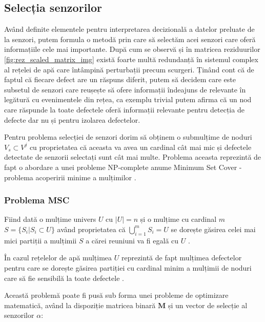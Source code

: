 \subsection{Selecția senzorilor}

Având definite elementele pentru interpretarea decizională a datelor preluate de la senzori, putem formula o metodă prin care să selectăm acei senzori care oferă informațiile cele mai importante. După cum se observă și în matricea reziduurilor \ref{fig:rez_scaled_matrix_img} există foarte multă redundanță în sistemul complex al rețelei de apă care întâmpină perturbații precum scurgeri. Ținând cont că de faptul că fiecare defect are un răspuns diferit, putem să decidem care este subsetul de senzori care reușește să ofere informații îndeajuns de relevante în legătură cu evenimentele din rețea, ca exemplu trivial putem afirma că un nod care răspunde la toate defectele oferă informații relevante pentru detecția de defecte dar nu și pentru izolarea defectelor.

Pentru problema selecției de senzori dorim să obținem o submulțime de noduri $V_s \subset V^j$ cu proprietatea că aceasta va avea un cardinal cât mai mic și defectele detectate de senzorii selectați sunt cât mai multe. Problema aceasta reprezintă de fapt o abordare a unei probleme NP-complete anume Minimum Set Cover - problema acoperirii minime a mulțimilor \cite{perelman2016sensor}.

\subsubsection{Problema MSC} 
Fiind dată o mulțime univers $U$ cu $|U| = n$ și o mulțime cu cardinal $m$ $S = \{S_i | S_i \subset U\}$ având proprietatea că  $\bigcup\limits_{i=1}^{m} S_{i} = U$ se dorește găsirea celei mai mici partiții a mulțimii $S$ a cărei reuniuni va fi egală cu $U$ \cite{CLRS}. 

În cazul rețelelor de apă mulțimea $U$ reprezintă de fapt mulțimea defectelor pentru care se dorește găsirea partiției cu cardinal minim a mulțimii de noduri care să fie sensibilă la toate defectele \cite{perelman2016sensor}.

Această problemă poate fi pusă sub forma unei probleme de optimizare matematică, având la dispoziție matricea binară $\mathbf{M}$ și un vector de selecție al senzorilor $\alpha$:


